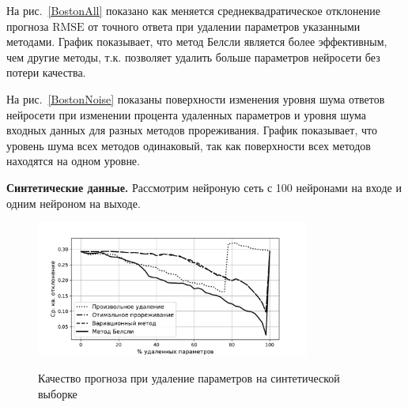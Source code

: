 На рис.~\ref{BostonAll} показано как меняется среднеквадратическое отклонение прогноза $\text{RMSE}$ от точного ответа  при удалении параметров указанными методами. График показывает, что метод Белсли является более эффективным, чем другие методы, т.к. позволяет удалить больше параметров нейросети без потери качества.

На рис.~\ref{BostonNoise} показаны поверхности изменения уровня шума ответов нейросети при изменении процента удаленных параметров и уровня шума входных данных для разных методов прореживания. График показывает, что уровень шума всех методов одинаковый, так как поверхности всех методов находятся на одном уровне.


\textbf{Синтетические данные.} Рассмотрим нейроную сеть с 100 нейронами на входе и одним нейроном на выходе.

\begin{figure}[h!t]\center
\includegraphics[width=0.8\textwidth]{plots/grabovoy/Data1/All.pdf}\\
\caption{Качество прогноза при удаление параметров на синтетической выборке}
\label{Data1All}
\end{figure}

